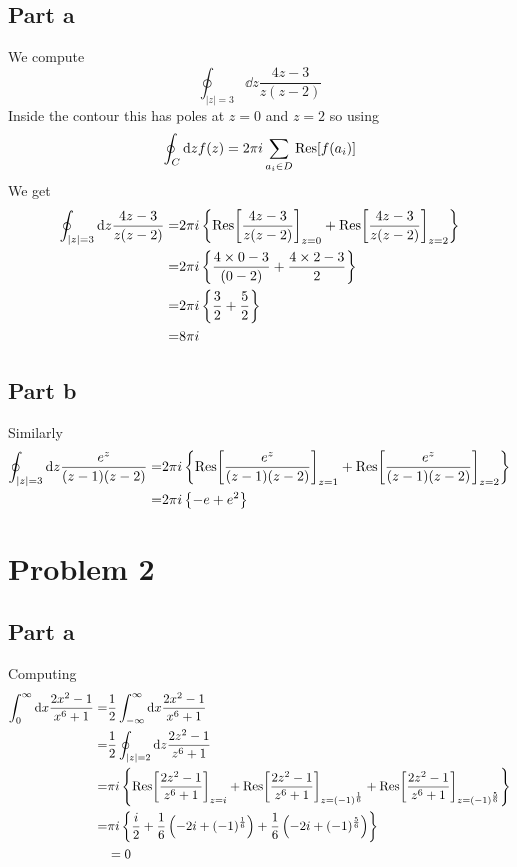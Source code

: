 \documentclass[a4paper,12pt]{article}
\begin{document}
\subsection*{Part a}
We compute
\begin{equation}
\oint_{|z|=3} \dd z\frac{4z-3}{z(z-2)}
\end{equation}
Inside the contour this has poles at $z=0$ and $z=2$ so using 
\begin{equation}
	\oint _C \dd z  f(z)=2\pi i \sum_{a_i\in D}\Res[f(a_i)]
\end{equation}
We get
\begin{equation}
\begin{aligned}
	\oint_{|z|=3} \dd z\frac{4z-3}{z(z-2)}=&2\pi i \left\{\Res[\frac{4z-3}{z(z-2)}]_{z=0}+\Res[\frac{4z-3}{z(z-2)}]_{z=2}\right\}\\
	=&2\pi i \left\{\frac{4\times 0-3}{(0-2)}+\frac{4\times 2-3}{2}\right\}\\
	=&2\pi i \left\{\frac{3}{2}+\frac{5}{2}\right\}\\	
	=&8\pi i 
\end{aligned}
\end{equation}
\subsection*{Part b}
Similarly
\begin{equation}
	\begin{aligned}
		\oint_{|z|=3} \dd z\frac{e^z}{(z-1)(z-2)}=&2\pi i \left\{\Res[\frac{e^z}{(z-1)(z-2)}]_{z=1}+\Res[\frac{e^z}{(z-1)(z-2)}]_{z=2}\right\}\\
		=&2\pi i \left\{-e+e^2\right\}\\
	\end{aligned}
\end{equation}
\section{Problem 2}
\subsection*{Part a}
Computing
\begin{equation}
	\begin{aligned}
		\int_{0}^{\infty}\dd x\frac{2x^2-1}{x^6+1}
		=&	\frac{1}{2}\int_{-\infty}^{\infty}\dd x\frac{2x^2-1}{x^6+1}
		\\
		=&\frac{1}{2}\oint_{|z|=2} \dd z\frac{2z^2-1}{z^6+1}\\
		=&\pi i \left\{\Res[\frac{2z^2-1}{z^6+1}]_{z=i}+\Res[\frac{2z^2-1}{z^6+1}]_{z=(-1)^{\frac{1}{6}}}+\Res[\frac{2z^2-1}{z^6+1}]_{z=(-1)^{\frac{5}{6}}}\right\}\\
		=&\pi i \left\{\frac{i}{2}+\frac{1}{6}\left(-2i+(-1)^{\frac{1}{6}}\right)+\frac{1}{6}\left(-2i+(-1)^{\frac{5}{6}}\right)\right\}\\
		&=0
	\end{aligned}
\end{equation}
\end{document}
